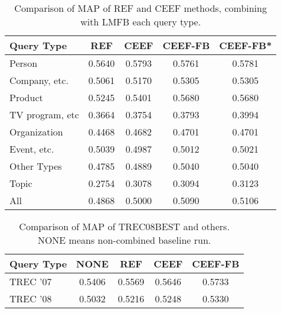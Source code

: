 \begin{table}
	\centering
		\begin{tabular}{lS[tabnumalign=centre,tabformat=1.4,decimalsymbol=comma]S[tabnumalign=centre,tabformat=1.4,decimalsymbol=comma]S[tabnumalign=centre,tabformat=1.4,decimalsymbol=comma]S[tabnumalign=centre,tabformat=1.4,decimalsymbol=comma]}
			\toprule
			Query Type & {REF} & {CEEF} & {CEEF-FB} & {CEEF-FB*}\\
			\midrule
			Person & 0.5640 & 0.5793 & 0.5761 & 0.5781\\
			Company, etc. & 0.5061 & 0.5170 & 0.5305 & 0.5305\\
			Product & 0.5245 & 0.5401 & 0.5680 & 0.5680\\
			TV program, etc & 0.3664 & 0.3754 & 0.3793 & 0.3994\\
			Organization & 0.4468 & 0.4682 & 0.4701 & 0.4701\\
			Event, etc. & 0.5039 & 0.4987 & 0.5012 & 0.5021\\
			Other Types & 0.4785 & 0.4889 & 0.5040 & 0.5040\\
			Topic & 0.2754 & 0.3078 & 0.3094 & 0.3123\\
			All & 0.4868 & 0.5000 & 0.5090 & 0.5106\\
			\bottomrule
		\end{tabular}
		\caption{Comparison of MAP of REF and CEEF methods, combining with LMFB each query type.\cite{paper:NaNg}}
\end{table}








\begin{table}
	\centering
	\begin{tabular}{lS[tabnumalign=centre,tabformat=1.4,decimalsymbol=comma]S[tabnumalign=centre,tabformat=1.4,decimalsymbol=comma]S[tabnumalign=centre,tabformat=1.4,decimalsymbol=comma]S[tabnumalign=centre,tabformat=1.4,decimalsymbol=comma]}
		\toprule
		Query Type & {NONE} & {REF} & {CEEF} & {CEEF-FB}\\
		\midrule
		TREC '07 & 0.5406 & 0.5569 & 0.5646 & 0.5733\\
		TREC '08 & 0.5032 & 0.5216 & 0.5248 & 0.5330\\
		\bottomrule
	\end{tabular}
	\caption{Comparison of MAP of TREC08BEST and others. NONE means non-combined baseline run.}
	\cite{paper:NaNg}
\end{table}

